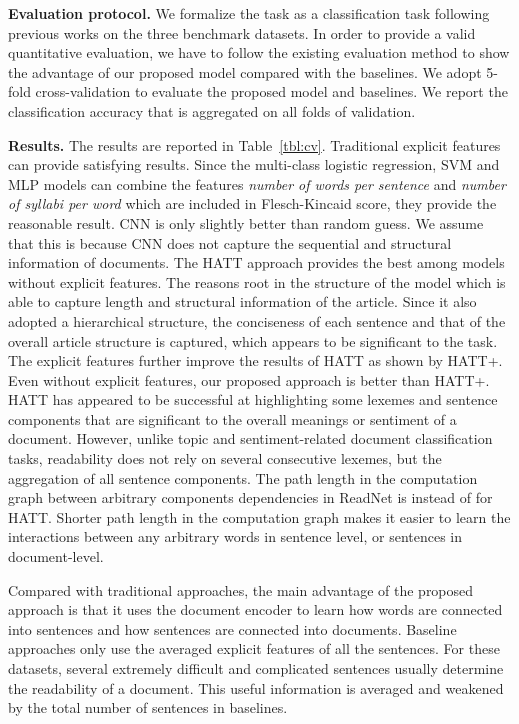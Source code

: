 \documentclass[runningheads]{llncs}
\begin{document}
\textbf{Evaluation protocol.} We formalize the task as a classification task following previous works on the three benchmark datasets. In order to provide a valid quantitative evaluation, we have to follow the existing evaluation method to show the advantage of our proposed model compared with the baselines. We adopt 5-fold cross-validation to evaluate the proposed model and baselines. We report the classification accuracy that is aggregated on all folds of validation. 




\textbf{Results.} The results are reported in Table~\ref{tbl:cv}.
Traditional explicit features can provide satisfying results. Since the multi-class logistic regression, SVM and MLP models can combine the features \emph{number of words per sentence} and \emph{number of syllabi per word} which are included in Flesch-Kincaid score, they provide the reasonable result.
	 CNN is only slightly better than random guess.  We assume that this is because CNN does not capture the sequential and structural information of documents. The HATT approach provides the best among models without explicit features. The reasons root in the structure of the model which is able to capture length and structural information of the article. Since it also adopted a hierarchical structure, the conciseness of each sentence and that of the overall article structure is captured, which appears to be significant to the task.
The explicit features further improve the results of HATT as shown by HATT+.
	 Even without explicit features, our proposed approach is better than HATT+.
     HATT has appeared to be successful at highlighting some lexemes and sentence components that are significant to the overall meanings or sentiment of a document. However, unlike topic and sentiment-related document classification tasks, readability does not rely on several consecutive lexemes, but the aggregation of all sentence components. The path length in the computation graph between arbitrary components dependencies in ReadNet is  instead of  for HATT. Shorter path length in the computation graph makes it easier to learn the interactions between any arbitrary words in sentence level, or sentences in document-level.
     






Compared with traditional approaches, the main advantage of the proposed approach is that it uses the document encoder to learn how words are connected into sentences and how sentences are connected into documents. Baseline approaches only use the averaged explicit features of all the sentences. For these datasets, several extremely difficult and complicated sentences usually determine the readability of a document. This useful information is averaged and weakened by the total number of sentences in baselines.
\end{document}
